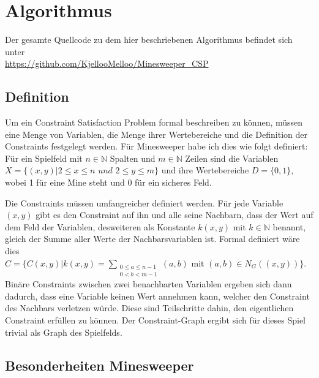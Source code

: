 %
\graphicspath{{chapters/images/}}
\section{Algorithmus}

Der gesamte Quellcode zu dem hier beschriebenen Algorithmus befindet sich unter\\
\url{https://github.com/KjellooMelloo/Minesweeper_CSP}

\subsection{Definition}

Um ein Constraint Satisfaction Problem formal beschreiben zu können, müssen eine Menge von Variablen, die Menge 
ihrer Wertebereiche und die Definition der Constraints festgelegt werden. Für Minesweeper habe ich dies wie folgt definiert:\\
Für ein Spielfeld mit $n\in \mathbb{N}$ Spalten und $m\in\mathbb{N}$ Zeilen sind
die Variablen\\
$X=\{(x, y) | 2\le x\le n  \textit{ und }  2\le y\le m\}$
und ihre Wertebereiche $D=\{0, 1\}$, wobei 1 für eine Mine steht und 0 für ein sicheres Feld.

Die Constraints müssen umfangreicher definiert werden. Für jede Variable $(x, y)$ gibt es den Constraint auf ihn und alle seine
Nachbarn, dass der Wert auf dem Feld der Variablen, desweiteren als Konstante $k(x, y) \text{ mit } k\in\mathbb{N}$ 
benannt, gleich der Summe aller Werte der Nachbarsvariablen ist. Formal definiert wäre dies\\
$C=\{C(x, y) | k(x, y) = \sum_{\substack{0\le a\le n-1\\0<b<m-1}}{(a, b)} \text{ mit } (a, b)\in N_G((x, y))\}$.\\
Binäre Constraints zwischen zwei benachbarten Variablen ergeben sich dann dadurch, dass eine Variable keinen Wert annehmen kann, 
welcher den Constraint des Nachbars verletzen würde. Diese sind Teilschritte dahin, den eigentlichen Constraint erfüllen zu können.
Der Constraint-Graph ergibt sich für dieses Spiel trivial als Graph des Spielfelds.

\subsection{Besonderheiten Minesweeper}

